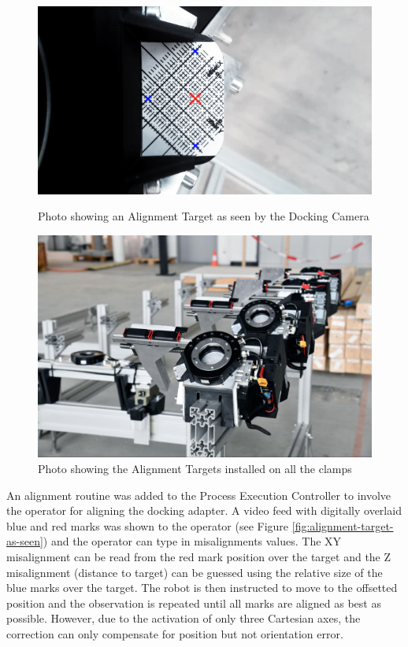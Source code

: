 \begin{figure}[!h]
    \centering
    \begin{minipage}{0.49\textwidth}
        \centering
        \includegraphics[width=\textwidth]{images/6b/img11.jpg}
        \caption{Photo showing an Alignment Target as seen by the Docking Camera}
        \label{fig:alignment-target-as-seen}
    \end{minipage}
    \hfill
    \begin{minipage}{0.49\textwidth}
        \centering
        \includegraphics[width=\textwidth]{images/6b/img10.jpg}
        \caption{Photo showing the Alignment Targets installed on all the clamps}
        \label{fig:alignment-targets-on-clamps}
    \end{minipage}
\end{figure}


An alignment routine was added to the Process Execution Controller to involve the operator for aligning the docking adapter. A video feed with digitally overlaid blue and red marks was shown to the operator (see Figure \ref{fig:alignment-target-as-seen}) and the operator can type in misalignments values. The XY misalignment can be read from the red mark position over the target and the Z misalignment (distance to target) can be guessed using the relative size of the blue marks over the target. The robot is then instructed to move to the offsetted position and the observation is repeated until all marks are aligned as best as possible. However, due to the activation of only three Cartesian axes, the correction can only compensate for position but not orientation error. 

